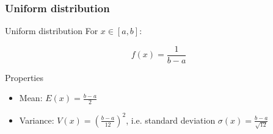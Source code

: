 \documentclass[9pt]{beamer}
\begin{document}
\begin{frame}
 \frametitle{Uniform distribution}
 
 \begin{block}{Uniform distribution}
  For $x \in [a,b]$:
  
  $$f(x) = \frac{1}{b-a}$$
 \end{block}

 \begin{block}{Properties}
  \begin{itemize}
   \item Mean: $E(x) = \frac{b-a}{2}$
   \item Variance: $V(x) = \left(\frac{b-a}{12}\right)^2$, i.e. standard deviation $\sigma(x) = \frac{b-a}{\sqrt{12}}$
  \end{itemize}

 \end{block}

 
\end{frame}
\end{document}
